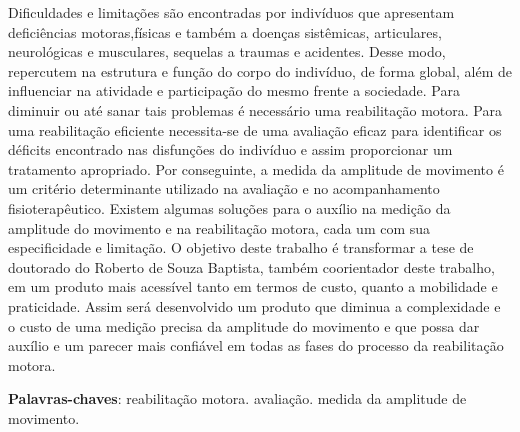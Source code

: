 \begin{resumo}

Dificuldades e limitações são encontradas por indivíduos que apresentam deficiências
 motoras,físicas e também a doenças sistêmicas, articulares, neurológicas e musculares,
 sequelas a traumas e acidentes. Desse modo, repercutem na estrutura e função do corpo
 do indivíduo, de forma global, além de influenciar na atividade e participação do
 mesmo frente a sociedade. Para diminuir ou até sanar tais problemas é necessário uma
 reabilitação motora. Para uma reabilitação eficiente necessita-se de uma avaliação
 eficaz para identificar os déficits encontrado nas disfunções do indivíduo e assim 
proporcionar um tratamento apropriado. Por conseguinte, a medida da amplitude de
 movimento é um critério determinante utilizado na avaliação e no acompanhamento
 fisioterapêutico. Existem algumas soluções para o auxílio na medição da amplitude
 do movimento e na reabilitação motora, cada um com sua especificidade e limitação. 
O objetivo deste trabalho é transformar a tese de doutorado do Roberto de Souza Baptista, 
também coorientador deste trabalho, em um produto mais acessível tanto em termos de custo,
 quanto a mobilidade e praticidade. Assim será desenvolvido um produto que diminua a 
complexidade e o custo de uma medição precisa da amplitude do movimento e que possa
 dar auxílio e um parecer mais confiável em todas as fases do processo da reabilitação motora.
 \vspace{\onelineskip}
    
 \noindent
 \textbf{Palavras-chaves}: reabilitação motora. avaliação. medida da amplitude de movimento.
\end{resumo}
